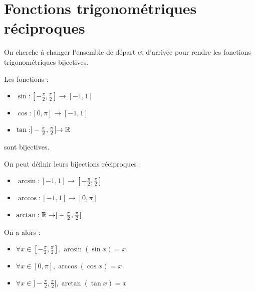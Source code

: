 \section{Fonctions trigonométriques réciproques}
\begin{remarque}
	On cherche à changer l'ensemble de départ et d'arrivée pour rendre les fonctions trigonométriques bijectives.
\end{remarque}

\begin{graybox}
	\begin{proposition}[]
		Les fonctions :
		\begin{itemize}
			\item $\sin : [-\frac{\pi}{2}, \frac{\pi}{2}] \to [-1, 1]$
			\item $\cos : [0, \pi] \to [-1,1]$
			\item $\tan : ]-\frac{\pi}{2}, \frac{\pi}{2}[ \to \mathbb{R}$
		\end{itemize}
		sont bijectives.
	\end{proposition}
\end{graybox}

\begin{graybox}
	\begin{proposition}[]
		On peut définir leurs bijections réciproques :
		\begin{itemize}
			\item $\arcsin : [-1,1] \to [-\frac{\pi}{2},\frac{\pi}{2}]$
			\item $\arccos : [-1,1] \to [0, \pi]$
			\item $\arctan : \mathbb{R} \to ]-\frac{\pi}{2},\frac{\pi}{2}[$
		\end{itemize}
	\end{proposition}
\end{graybox}

\begin{graybox}
	\begin{proposition}[]
		On a alors : 
		\begin{itemize}
			\item $\forall x \in [-\frac{\pi}{2}, \frac{\pi}{2}], \arcsin{(\sin{x})} = x $
			\item $\forall x \in [0, \pi], \arccos{(\cos{x})} = x$
			\item $\forall x \in ]-\frac{\pi}{2}, \frac{\pi}{2}[, \arctan{(\tan{x})} = x$
		\end{itemize}
	\end{proposition}
\end{graybox}

